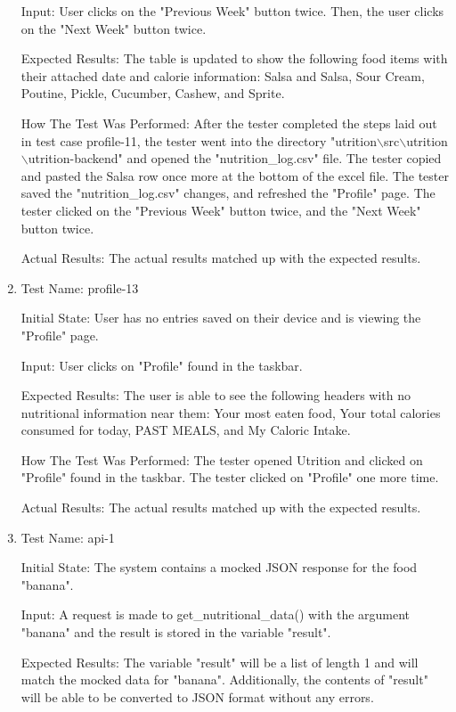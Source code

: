 \documentclass[12pt, titlepage]{article}
\begin{document}
\begin{enumerate}
		Input: User clicks on the "Previous Week" button twice. Then, the user clicks on the "Next Week" button twice.
		
		Expected Results: The table is updated to show the following food items with their attached date and calorie information: Salsa and Salsa, Sour Cream, Poutine, Pickle, Cucumber, Cashew, and Sprite.
		
		How The Test Was Performed: After the tester completed the steps laid out in test case profile-11, the tester went into the directory "utrition$\backslash$src$\backslash$utrition$\backslash$utrition-backend" and opened the "nutrition\_log.csv" file. The tester copied and pasted the Salsa row once more at the bottom of the excel file. The tester saved the "nutrition\_log.csv" changes, and refreshed the "Profile" page. The tester clicked on the "Previous Week" button twice, and the "Next Week" button twice.
		
		Actual Results: The actual results matched up with the expected results.
		
		\item{Test Name: profile-13}
		
		Initial State: User has no entries saved on their device and is viewing the "Profile" page.
		
		Input: User clicks on "Profile" found in the taskbar.
		
		Expected Results: The user is able to see the following headers with no nutritional information near them: Your most eaten food, Your total calories consumed for today, PAST MEALS, and My Caloric Intake.
		
		How The Test Was Performed: The tester opened Utrition and clicked on "Profile" found in the taskbar. The tester clicked on "Profile" one more time.
		
		Actual Results: The actual results matched up with the expected results.

		\item{Test Name: api-1}
		
		Initial State: The system contains a mocked JSON response for the food "banana".
		
		Input: A request is made to get\_nutritional\_data() with the argument "banana" and the result is stored in the variable "result".
		
		Expected Results: The variable "result" will be a list of length 1 and will match the mocked data for "banana". Additionally, the contents of "result" will be able to be converted to JSON format without any errors.
		

\end{enumerate}
\end{document}

